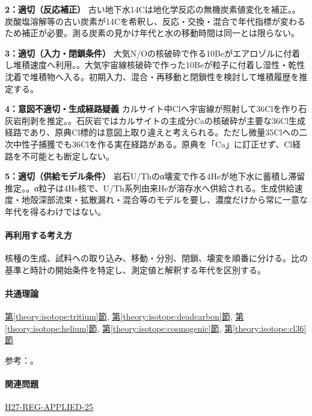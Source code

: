 \noindent\textbf{2：適切（反応補正）} 古い地下水14Cは地化学反応の無機炭素値変化を補正。。炭酸塩溶解等の古い炭素が14Cを希釈し、反応・交換・混合で年代指標が変わるため補正が必要。測る炭素の見かけ年代と水の移動時間は同一とは限らない。\par

\noindent\textbf{3：適切（入力・閉鎖条件）} 大気N/Oの核破砕で作る10Beがエアロゾルに付着し堆積速度へ利用。。大気宇宙線核破砕で作った10Beが粒子に付着し湿性・乾性沈着で堆積物へ入る。初期入力、混合・再移動と閉鎖性を検討して堆積履歴を推定する。\par

\noindent\textbf{4：意図不適切・生成経路疑義} カルサイト中Clへ宇宙線が照射して36Clを作り石灰岩削剥を推定。。石灰岩ではカルサイトの主成分Caの核破砕が主要な36Cl生成経路であり、原典Cl標的は意図上取り違えと考えられる。ただし微量35Clへの二次中性子捕獲でも36Clを作る実在経路がある。原典を「Ca」に訂正せず、Cl経路を不可能とも断定しない。\par

\noindent\textbf{5：適切（供給モデル条件）} 岩石U/Thのα壊変で作る4Heが地下水に蓄積し滞留推定。。α粒子は4He核で、U/Th系列由来Heが溶存水へ供給される。生成供給速度・地殻深部流束・拡散漏れ・混合等のモデルを要し、濃度だけから常に一意な年代を得るわけではない。\par

\paragraph{再利用する考え方} 核種の生成、試料への取り込み、移動・分別、閉鎖、壊変を順番に分ける。比の基準と時計の開始条件を特定し、測定値と解釈する年代を区別する。

\paragraph{共通理論} \hyperref[theory:isotope:tritium]{第\ref*{theory:isotope:tritium}節}, \hyperref[theory:isotope:deadcarbon]{第\ref*{theory:isotope:deadcarbon}節}, \hyperref[theory:isotope:helium]{第\ref*{theory:isotope:helium}節}, \hyperref[theory:isotope:cosmogenic]{第\ref*{theory:isotope:cosmogenic}節}, \hyperref[theory:isotope:cl36]{第\ref*{theory:isotope:cl36}節}

\par 参考：\cite{iso_tritium_clock,iso_groundwater,iso_deadcarbon,iso_be10,iso_cl36,iso_cl36_uw}。

\paragraph{関連問題} \hyperref[q:h27-reg-applied-25]{H27-REG-APPLIED-25}

